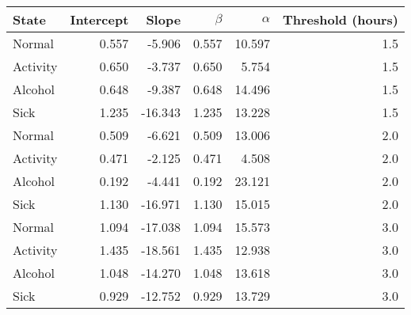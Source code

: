 
\begin{tabular}{lrrrrr}
\toprule
State & Intercept & Slope & $\beta$ & $\alpha$ & Threshold (hours)\\
\midrule
Normal & 0.557 & -5.906 & 0.557 & 10.597 & 1.5\\
Activity & 0.650 & -3.737 & 0.650 & 5.754 & 1.5\\
Alcohol & 0.648 & -9.387 & 0.648 & 14.496 & 1.5\\
Sick & 1.235 & -16.343 & 1.235 & 13.228 & 1.5\\
\addlinespace
Normal & 0.509 & -6.621 & 0.509 & 13.006 & 2.0\\
Activity & 0.471 & -2.125 & 0.471 & 4.508 & 2.0\\
Alcohol & 0.192 & -4.441 & 0.192 & 23.121 & 2.0\\
Sick & 1.130 & -16.971 & 1.130 & 15.015 & 2.0\\
\addlinespace
Normal & 1.094 & -17.038 & 1.094 & 15.573 & 3.0\\
Activity & 1.435 & -18.561 & 1.435 & 12.938 & 3.0\\
Alcohol & 1.048 & -14.270 & 1.048 & 13.618 & 3.0\\
Sick & 0.929 & -12.752 & 0.929 & 13.729 & 3.0\\
\bottomrule
\end{tabular}